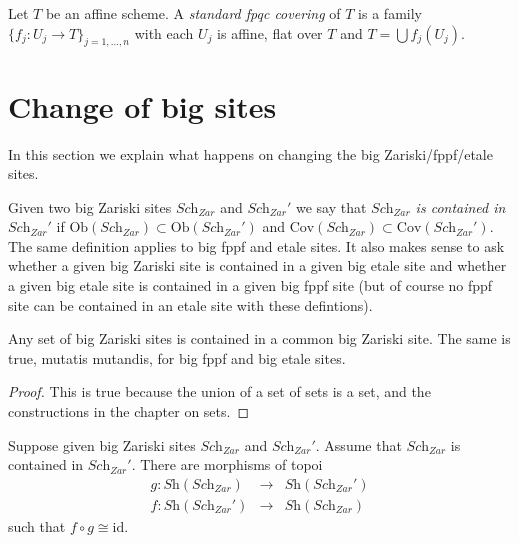 \begin{definition}
\label{definition-standard-fpqc}
Let $T$ be an affine scheme. A {\it standard fpqc covering}
of $T$ is a family $\{f_j : U_j \to T\}_{j = 1, \ldots, n}$
with each $U_j$ is affine, flat over $T$ and $T = \bigcup f_j(U_j)$.
\end{definition}




























\section{Change of big sites}
\label{section-change-alpha}

\noindent
In this section we explain what happens on changing the big
Zariski/fppf/etale sites.

\medskip\noindent
Given two big Zariski sites $\textit{Sch}_{Zar}$ and
$\textit{Sch}_{Zar}'$ we say that {\it $\textit{Sch}_{Zar}$ is contained in
$\textit{Sch}_{Zar}'$} if
$\text{Ob}(\textit{Sch}_{Zar}) \subset \text{Ob}(\textit{Sch}_{Zar}')$
and
$\text{Cov}(\textit{Sch}_{Zar}) \subset \text{Cov}(\textit{Sch}_{Zar}')$.
The same definition applies to big fppf and etale sites. It also makes
sense to ask whether a given big Zariski site is contained in a
given big etale site and whether a given big etale site is contained in a
given big fppf site (but of course no fppf site can be contained in an
etale site with these defintions).

\begin{lemma}
\label{lemma-contained-in}
Any set of big Zariski sites is contained in a common big Zariski site.
The same is true, mutatis mutandis, for big fppf and big etale sites.
\end{lemma}

\begin{proof}
This is true because the union of a set of sets is a set, and the
constructions in the chapter on sets.
\end{proof}

\begin{lemma}
\label{lemma-change-alpha-Zariski}
Suppose given big Zariski sites $\textit{Sch}_{Zar}$ and
$\textit{Sch}_{Zar}'$. Assume that $\textit{Sch}_{Zar}$
is contained in $\textit{Sch}_{Zar}'$. There are morphisms of
topoi
\begin{eqnarray*}
g : \textit{Sh}(\textit{Sch}_{Zar}) &
\longrightarrow &
\textit{Sh}(\textit{Sch}_{Zar}') \\
f : \textit{Sh}(\textit{Sch}_{Zar}') &
\longrightarrow &
\textit{Sh}(\textit{Sch}_{Zar})
\end{eqnarray*}
such that $f \circ g \cong \text{id}$.
\end{lemma}

